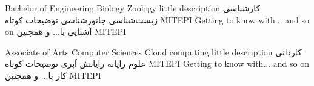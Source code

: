 
\educationGradeCI
{Bachelor of Engineering}
{Biology}
{Zoology}
{little description}
{کارشناسی}
{زیست‌شناسی}
{جانورشناسی}
{توضیحات کوتاه}
{MITEPI}
\educationGradeCII
{Getting to know with... and so on}
{آشنایی با... و همچنین}
{\parttime}
{}
{}
{}
{MITEPI}

\educationGradeCI
{Associate of Arts}
{Computer Sciences}
{Cloud computing}
{little description}
{کاردانی}
{علوم رایانه}
{رایانش اَبری}
{توضیحات کوتاه}
{MITEPI}
\educationGradeCII
{Getting to know with... and so on}
{کار با... و همچنین}
{\fulltime}
{}
{}
{}
{MITEPI}
